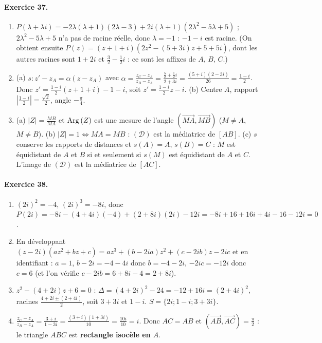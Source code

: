 \begin{corrige}
\paragraph{Exercice 37.}
\begin{enumerate}
\item $P(\lambda + \lambda i) = -2\lambda(\lambda + 1)(2\lambda - 3) + 2i(\lambda + 1)(2\lambda^2 - 5\lambda + 5)$ ; $2\lambda^2 - 5\lambda + 5$ n'a pas de racine r\'eelle,
      donc $\boxed{\lambda = -1}$ : $-1 - i$ est racine. (On obtient ensuite $P(z) = (z + 1 + i)\left(2z^2 - (5 + 3i)z + 5 + 5i\right)$, dont les autres racines sont
      $1 + 2i$ et $\frac{3}{2} - \frac{1}{2}i$ : ce sont les affixes de $A$, $B$, $C$.)
\item (a) $s : z' - z_A = \alpha(z - z_A)$ avec $\alpha = \frac{z_C - z_A}{z_B - z_A} = \frac{\frac{5}{2} + \frac{1}{2}i}{2 + 3i} = \frac{(5 + i)(2 - 3i)}{26} = \frac{1 - i}{2}$.
      Donc $z' = \frac{1 - i}{2}(z + 1 + i) - 1 - i$, soit $\boxed{z' = \frac{1 - i}{2}z - i}$.
      (b) Centre $A$, rapport $\left|\frac{1 - i}{2}\right| = \frac{\sqrt{2}}{2}$, angle $-\frac{\pi}{4}$.
\item (a) $|Z| = \frac{MB}{MA}$ et $\mathrm{Arg}\left( Z \right)$ est une mesure de l'angle $\left(\overrightarrow{MA},\overrightarrow{MB}\right)$ ($M \neq A$, $M \neq B$).
      (b) $|Z| = 1 \iff MA = MB$ : $(\mathscr{D})$ est la m\'ediatrice de $[AB]$.
      (c) $s$ conserve les rapports de distances et $s(A) = A$, $s(B) = C$ : $M$ est \'equidistant de $A$ et $B$ si et seulement si $s(M)$ est \'equidistant de $A$ et $C$.
      L'image de $(\mathscr{D})$ est la m\'ediatrice de $[AC]$.
\end{enumerate}

\paragraph{Exercice 38.}
\begin{enumerate}
\item $(2i)^2 = -4$, $(2i)^3 = -8i$, donc
      $P(2i) = -8i - (4+4i)(-4) + (2+8i)(2i) - 12i = -8i + 16 + 16i + 4i - 16 - 12i = \boxed{0}$.
\item En d\'eveloppant $(z - 2i)(az^2 + bz + c) = az^3 + (b - 2ia)z^2 + (c - 2ib)z - 2ic$ et en identifiant :
      $a = 1$, $b - 2i = -4 - 4i$ donc $b = -4 - 2i$, $-2ic = -12i$ donc $c = 6$ (et l'on v\'erifie $c - 2ib = 6 + 8i - 4 = 2 + 8i$).
\item $z^2 - (4 + 2i)z + 6 = 0$ : $\Delta = (4 + 2i)^2 - 24 = -12 + 16i = (2 + 4i)^2$, racines $\frac{4 + 2i \pm (2 + 4i)}{2}$, soit $3 + 3i$ et $1 - i$.
      $S = \{2i ; 1 - i ; 3 + 3i\}$.
\item $\frac{z_C - z_A}{z_B - z_A} = \frac{3 + i}{1 - 3i} = \frac{(3 + i)(1 + 3i)}{10} = \frac{10i}{10} = i$.
      Donc $AC = AB$ et $\left(\overrightarrow{AB},\overrightarrow{AC}\right) = \frac{\pi}{2}$ : le triangle $ABC$ est \textbf{rectangle isoc\`ele en $A$}.
\end{enumerate}


\end{corrige}
